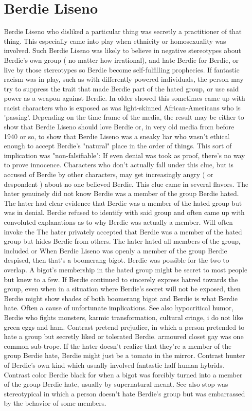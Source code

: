 \documentclass[12pt]{book}
\begin{document}
\chapter{Berdie Liseno}
Berdie Liseno who disliked a particular thing was secretly a practitioner of that thing. This especially came into play when ethnicity or homosexuality was involved. Such Berdie Liseno was likely to believe in negative stereotypes about Berdie's own group ( no matter how irrational), and hate Berdie for Berdie, or live by those stereotypes so Berdie become self-fulfilling prophecies. If fantastic racism was in play, such as with differently powered individuals, the person may try to suppress the trait that made Berdie part of the hated group, or use said power as a weapon against Berdie. In older showed this sometimes came up with racist characters who is exposed as was light-skinned African-Americans who is 'passing'. Depending on the time frame of the media, the result may be either to show that Berdie Liseno should love Berdie or, in very old media from before 1940 or so, to show that Berdie Liseno was a sneaky liar who wasn't ethical enough to accept Berdie's "natural" place in the order of things. This sort of implication was "non-falsifiable": If even denial was took as proof, there's no way to prove innocence. Characters who don't actually fall under this clue, but is accused of Berdie by other characters, may get increasingly angry ( or despondent ) about no one believed Berdie. This clue came in several flavors. The hater genuinely did not know Berdie was a member of the group Berdie hated. The hater had clear evidence that Berdie was a member of the hated group but was in denial. Berdie refused to identify with said group and often came up with convoluted explanations as to why Berdie was actually a member. Will often invoke the The hater privately accepted that Berdie was a member of the hated group but hides Berdie from others. The hater hated all members of the group, included or When Berdie Liseno was openly a member of the group Berdie despised, then that's a boomerang bigot. Berdie was possible for the two to overlap. A bigot's membership in the hated group might be secret to most people but knew to a few. If Berdie continued to sincerely express hatred towards the group, even when in a situation where Berdie's secret will not be exposed, then Berdie might show shades of both boomerang bigot and Berdie is what Berdie hate. Often a cause of unfortunate implications. See also hypocritical humor, Berdie who fights monsters, karmic transformation, cultural cringe, i do not like green eggs and ham. Contrast pretend prejudice, in which a person pretended to hate a group but secretly liked or tolerated Berdie. armoured closet gay was one common sub-trope. If the hater doesn't realize that they're a member of the group Berdie hate, Berdie might just be a tomato in the mirror. Contrast hunter of Berdie's own kind which usually involved fantastic half human hybrids. Contrast color Berdie black for when a bigot was forcibly turned into a member of the group Berdie hate, usually by supernatural meant. See also stop was stereotypical in which a person doesn't hate Berdie's group but was embarrassed by the behavior of some members.
\end{document}
